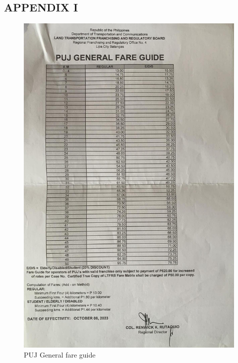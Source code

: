 \documentclass{icsthesis}
\begin{document}
\begin{mainmatter}
		\section{APPENDIX I}
\begin{figure}[!h]
    \centering
        \includegraphics[scale=0.25]{./figures/ltfrb/puj.jpeg}
    \caption{PUJ General fare guide}
\end{figure}


\end{mainmatter}
\end{document}
